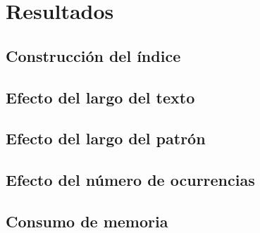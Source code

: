 \section{Resultados}
\subsection{Construcción del índice}
\subsection{Efecto del largo del texto}
\subsection{Efecto del largo del patrón}
\subsection{Efecto del número de ocurrencias}
\subsection{Consumo de memoria}
